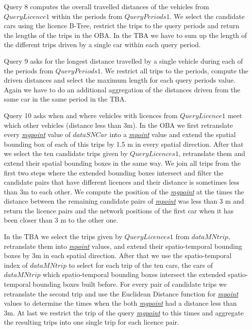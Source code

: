 \documentclass[a4paper]{article}
\newcommand{\dt}[1]{\textsl{\underline{#1}}}
\begin{document}
Query 8 computes the overall travelled distances of the vehicles from $QueryLicence1$
within the periods from $QueryPeriods1$. We select the candidate cars using the
licence B-Tree, restrict the trips to the query periods and return the lengths of the
trips in the OBA. In the TBA we have to sum up the length of the different
trips driven by a single car within each query period.

Query 9 asks for the longest distance travelled by a single vehicle during each
of the periods from $QueryPeriods1$. We restrict all trips to the periods, compute
the driven distances and select the maximum length for each query periods value.
Again we have to do an additional aggregation of the distances driven from the same
car in the same period in the TBA.

Query 10 asks when and where vehicles with licences from $QueryLicence1$ meet which
other vehicles (distance less than 3m). In the OBA we first retranslate every
\dt{mgpoint} value of $dataSNCar$ into a \dt{mpoint} value and extend the spatial
bounding box of each of this trips by 1.5 m in every spatial direction. After that we
select the ten candidate trips given by $QueryLicences1$, retranslate them and
extend their spatial bounding boxes in the same way. We join all trips from the
first two steps where the extended bounding boxes intersect and filter the
candidate pairs that have different licences and their distance is sometimes
less than 3m to each other. We compute the position of the \dt{mgpoint} at the
times the distance between the remaining candidate pairs of \dt{mpoint} was less
than 3 m and return the licence pairs and the network positions of the first car
when it has been closer than 3 m to the other one.

In the TBA we select the trips given by $QueryLicences1$ from
$dataMNtrip$, retranslate them into \dt{mpoint} values, and extend their spatio-temporal
bounding boxes by 3m in each spatial direction. After that we use the spatio-temporal
index of $dataMNtrip$ to select for each trip of the ten cars, the cars
of $dataMNtrip$ which spatio-temporal bounding boxes intersect the extended spatio-temporal
bounding boxes built before. For every pair of candidate trips we
retranslate the second trip and use the Euclidean Distance function for \dt{mpoint}
values to determine the times when the both \dt{mgpoint} had a distance less than 3m.
At last we restrict the trip of the query \dt{mgpoint} to this times and
aggregate the resulting trips into one single trip for each licence pair.
\end{document}
